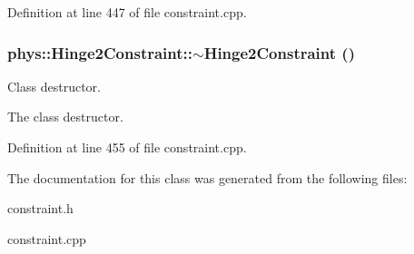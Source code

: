 Definition at line 447 of file constraint.cpp.

\hypertarget{classphys_1_1Hinge2Constraint_a8e3f1210140b8205e20e4a07a3e63195}{
\subsubsection[{$\sim$Hinge2Constraint}]{\setlength{\rightskip}{0pt plus 5cm}phys::Hinge2Constraint::$\sim$Hinge2Constraint ()}}
\label{d2/d16/classphys_1_1Hinge2Constraint_a8e3f1210140b8205e20e4a07a3e63195}


Class destructor. 

The class destructor. 

Definition at line 455 of file constraint.cpp.



The documentation for this class was generated from the following files:\begin{DoxyCompactItemize}
\item 
constraint.h\item 
constraint.cpp\end{DoxyCompactItemize}
